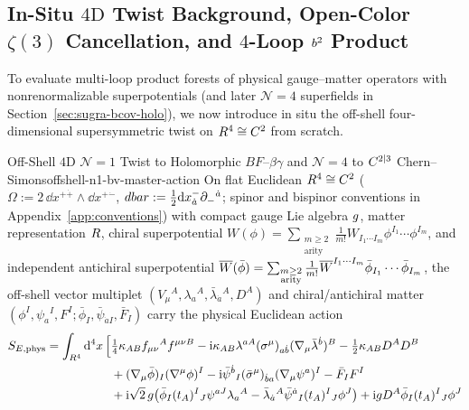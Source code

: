 \subsection{In-Situ \texorpdfstring{$4\mathrm{D}$}{4D} Twist Background, Open-Color \texorpdfstring{$\zeta(3)$}{zeta(3)} Cancellation, and \texorpdfstring{$4$}{4}-Loop \texorpdfstring{$b^2$}{b\^2} Product}
\label{subsec:universal-quartic-product}

To evaluate multi-loop product forests of physical gauge--matter operators with nonrenormalizable superpotentials (and later $\mathcal{N}=4$ superfields in Section~\ref{sec:sugra-bcov-holo}), we now introduce in situ the off-shell four-dimensional supersymmetric twist on $R^4 \cong C^2$ from scratch.

\begin{zkmodule}{Off-Shell $4\mathrm{D}$ $\mathcal{N}=1$ Twist to Holomorphic $BF$--$\beta\gamma$ and $\mathcal{N}=4$ to $C^{2|3}$ Chern--Simons}{offshell-n1-bv-master-action}
On flat Euclidean $R^4 \cong C^2$ ($\Omega := 2\,\dd x^{+\dot{+}}\wedge\dd x^{+\dot{-}}$, $dbar := \frac{1}{2}\mathrm{d} x^-_{\dot{a}}\partial_-{}^{\dot{a}}$; spinor and bispinor conventions in Appendix~\ref{app:conventions}) with compact gauge Lie algebra $g$, matter representation $R$, chiral superpotential $W(\phi) = \sum_{\substack{m\ge 2\\\mathrm{arity}}}\frac{1}{m!}W_{I_1\cdots I_m}\phi^{I_1}\cdots\phi^{I_m}$, and independent antichiral superpotential $\overline{W}(\bar{\phi}) = \sum_{\substack{m\ge 2\\\mathrm{arity}}}\frac{1}{m!}\overline{W}^{I_1\cdots I_m}\bar{\phi}_{I_1}\cdots\bar{\phi}_{I_m}$, the off-shell vector multiplet $(V_\mu{}^A, \lambda_a{}^A, \bar{\lambda}_{\dot{a}}{}^A, D^A)$ and chiral/antichiral matter $(\phi^I, \psi_a{}^I, F^I; \bar{\phi}_I, \bar{\psi}_{\dot{a}I}, \bar{F}_I)$ carry the physical Euclidean action
\begin{equation}
\label{eq:4d-offshell-euclidean-action}
\begin{aligned}
S_{E,\mathrm{phys}} = \int_{\RR^4}\dd^4x\,\Bigl[&\tfrac{1}{4}\kappa_{AB}f_{\mu\nu}{}^A f^{\mu\nu B} - \ii\kappa_{AB}\lambda^{a A}(\sigma^\mu)_{a\dot{b}}(\nabla_\mu\bar{\lambda}^{\dot{b}})^B - \tfrac{1}{2}\kappa_{AB}D^A D^B\\
&+ (\nabla_\mu\bar{\phi})_I(\nabla^\mu\phi)^I - \ii\bar{\psi}^{\dot{b}}{}_I(\bar{\sigma}^\mu)_{\dot{b}a}(\nabla_\mu\psi^a)^I - \bar{F}_I F^I\\
&+ \ii\sqrt{2}\,g\bigl(\bar{\phi}_I(t_A)^I{}_J\psi^{a J}\lambda_a{}^A - \bar{\lambda}_{\dot{a}}{}^A\bar{\psi}^{\dot{a}}{}_I(t_A)^I{}_J\phi^J\bigr) + \ii g D^A\bar{\phi}_I(t_A)^I{}_J\phi^J\\

\end{aligned}
\end{equation}
\end{zkmodule}
